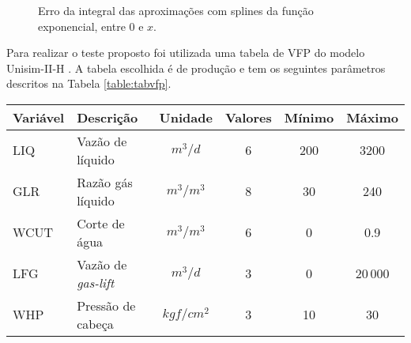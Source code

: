 \documentclass[final,5p]{elsarticle}
\numberwithin{equation}{section}
\begin{document}
        \begin{figure}[hbt!] 
            \caption{Erro da integral das aproximações com splines da função exponencial, entre 0 e $x$.}
            \label{fig:intexp}
        \end{figure}
        
        Para realizar o teste proposto foi utilizada uma tabela de VFP do modelo Unisim-II-H \cite{maschio2018case}. A tabela escolhida é de produção e tem os seguintes parâmetros descritos na Tabela \ref{table:tabvfp}.

        \begin{table*} 
            \caption{Parâmetros da tabela de VFP utilizada nas comparações. O parâmetro principal (BHP) é em $kgf/cm^2$.}
            \label{table:tabvfp}
            \begin{tabular}{ l l c c c c }
                \hline
                Variável & Descrição & Unidade & Valores & Mínimo & Máximo \\ 
                \hline
                LIQ  & Vazão de líquido         & $m^3/d$    & 6 & 200 &   3200 \\
                GLR  & Razão gás líquido        & $m^3/m^3$  & 8 & 30  &    240 \\
                WCUT & Corte de água            & $m^3/m^3$  & 6 &  0  &    0.9 \\
                LFG  & Vazão de \emph{gas-lift} & $m^3/d$    & 3 &  0  &  20$\,$000 \\
                WHP  & Pressão de cabeça        & $kgf/cm^2$ & 3 & 10  &     30 \\
                \hline
            \end{tabular}
        \end{table*}
\end{document}

